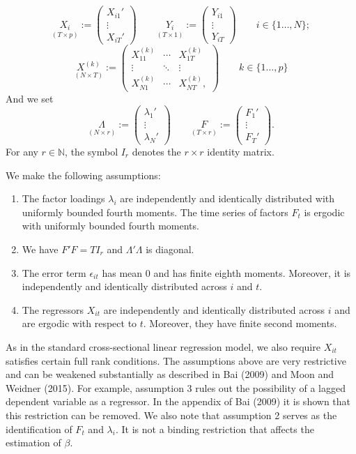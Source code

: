 \documentclass[a4paper]{article}
\newcommand{\IN}[0]{\mathbb{N}}
\begin{document}
\[
	\underset{(T\times p)}{X_i}:=
	\begin{pmatrix}
			X_{i1}'\\
			\vdots\\
			X_{iT}'
	\end{pmatrix}
	\qquad
	 \underset{(T \times 1)}{Y_i}:=
	 \begin{pmatrix}
			Y_{i1}\\
			\vdots\\
			Y_{iT}
	\end{pmatrix} \qquad i \in \{1\ldots, N\};
\]
\[
	\underset{(N \times T)}{X^{(k)}}:=
	\begin{pmatrix}
		X_{11}^{(k)} & \cdots & X_{1T}^{(k)} \\
		\vdots & \ddots &\vdots \\
		X_{N1}^{(k)} &\cdots  & X_{NT}^{(k)},
	\end{pmatrix}
	\qquad k \in \{1\ldots, p\}
\]
And we set
\[
		\underset{(N\times r)}{\Lambda}:=
		\begin{pmatrix}
			\lambda_1'\\
			\vdots\\
			\lambda_N'
		\end{pmatrix}
		\qquad
		\underset{(T \times r)}{F}:=
		\begin{pmatrix}
			F_1'\\
			\vdots\\
			F_T'
		\end{pmatrix}.
\]
For any $r \in \IN$, the symbol $I_r$ denotes the $r\times r$ identity matrix.

We make the following assumptions:
\begin{enumerate}
	\item The factor loadings $\lambda_i$ are independently and identically distributed with uniformly bounded fourth moments. The time series of factors $F_t$ is ergodic with uniformly bounded fourth moments.
	\item We have $F'F=TI_r$ and $\Lambda'\Lambda$ is diagonal.
	\item The error term $\epsilon_{it}$ has mean 0 and has finite eighth moments. Moreover, it is independently and identically distributed across $i$ and $t$.
	\item The regressors $X_{it}$ are independently and identically distributed across $i$ and are ergodic with respect to $t$. Moreover, they have finite second moments.
\end{enumerate}
As in the standard cross-sectional linear regression model, we also require $X_{it}$ satisfies certain full rank conditions. The assumptions above are very restrictive and can be weakened substantially as described in Bai (2009) and Moon and Weidner (2015). For example, assumption 3 rules out the possibility of a lagged dependent variable as a regressor. In the appendix of Bai (2009) it is shown that this restriction can be removed. We also note that assumption 2 serves as the identification of $F_t$ and $\lambda_i$. It is not a binding restriction that affects the estimation of $\beta$.
\end{document}
